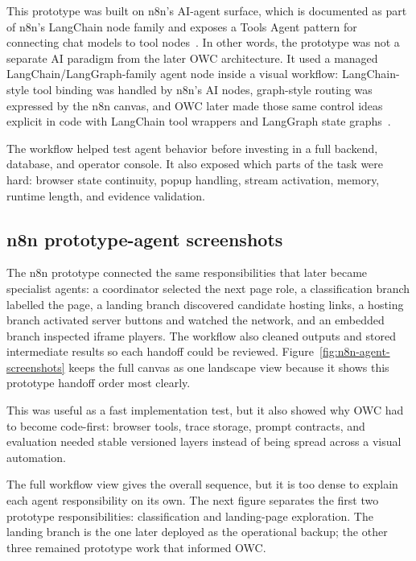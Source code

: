 This prototype was built on n8n's AI-agent surface, which is documented as part of
n8n's LangChain node family and exposes a Tools Agent pattern for connecting chat
models to tool nodes~\cite{n8n-langchain,n8n-ai-agent}. In other words, the prototype
was not a separate AI paradigm from the later OWC architecture. It used a managed
LangChain/LangGraph-family agent node inside a visual workflow: LangChain-style tool
binding was handled by n8n's AI nodes, graph-style routing was expressed by the n8n
canvas, and OWC later made those same control ideas explicit in code with LangChain tool
wrappers and LangGraph state graphs~\cite{langgraph-docs}.



The workflow helped test agent behavior before investing in a full backend,
database, and operator console. It also exposed which parts of the task were
hard: browser state continuity, popup handling, stream activation, memory,
runtime length, and evidence validation.

\subsection{n8n prototype-agent screenshots}

The n8n prototype connected the same responsibilities that later became specialist
agents: a coordinator selected the next page role, a classification branch labelled the
page, a landing branch discovered candidate hosting links, a hosting branch activated
server buttons and watched the network, and an embedded branch inspected iframe players.
The workflow also cleaned outputs and stored intermediate results so each handoff could
be reviewed. Figure~\ref{fig:n8n-agent-screenshots} keeps the full canvas as one
landscape view because it shows this prototype handoff order most clearly.

This was useful as a fast implementation test, but it also showed why OWC had to become
code-first: browser tools, trace storage, prompt contracts, and evaluation needed stable
versioned layers instead of being spread across a visual automation.


The full workflow view gives the overall sequence, but it is too dense to explain each
agent responsibility on its own. The next figure separates the first two prototype
responsibilities: classification and landing-page exploration. The landing branch is
the one later deployed as the operational backup; the other three remained prototype
work that informed OWC.

